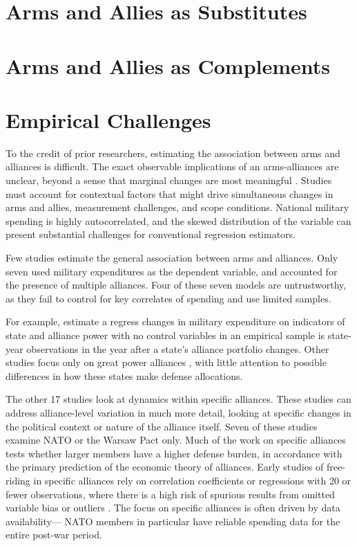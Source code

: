 \documentclass[12pt]{article}
\begin{document}
\section*{Arms and Allies as Substitutes}





\section*{Arms and Allies as Complements}



\section*{Empirical Challenges}


To the credit of prior researchers, estimating the association between arms and alliances is difficult. The exact observable implications of an arms-alliances are unclear, beyond a sense that marginal changes are most meaningful \citep{Morrow2000, Starr2000}. Studies must account for contextual factors that might drive simultaneous changes in arms and allies, measurement challenges, and scope conditions. National military spending is highly autocorrelated, and the skewed distribution of the variable can present substantial challenges for conventional regression estimators. 

Few studies estimate the general association between arms and alliances. Only seven used military expenditures as the dependent variable, and accounted for the presence of multiple alliances. Four of these seven models are untrustworthy, as they fail to control for key correlates of spending and use limited samples. 

For example, \citet{MorganPalmer2003} estimate a regress changes in military expenditure on indicators of state and alliance power with no control variables in an empirical sample is state-year observations in the year after a state's alliance portfolio changes. Other studies focus only on great power alliances \citep{ConybeareSandler1990, Conybeare1994, Diehl1994, MostSiverson1987}, with little attention to possible differences in how these states make defense allocations. 

The other 17 studies look at dynamics within specific alliances. These studies can address alliance-level variation in much more detail, looking at specific changes in the political context or nature of the alliance itself. Seven of these studies examine NATO or the Warsaw Pact only. Much of the work on specific alliances tests whether larger members have a higher defense burden, in accordance with the primary prediction of the economic theory of alliances. Early studies of free-riding in specific alliances rely on correlation coefficients or regressions with 20 or fewer observations, where there is a high risk of spurious results from omitted variable bias or outliers \citep{OlsonZeckhauser1966, Starr1974, Reisinger1983, Siroky2012}. The focus on specific alliances is often driven by data availability--- NATO members in particular have reliable spending data for the entire post-war period. 
\end{document}
